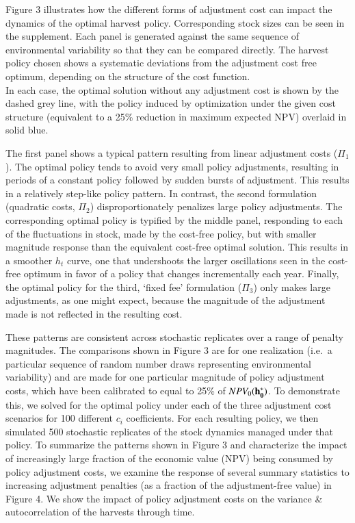 \documentclass[review,12pt,author-year,titlepage]{components/elsarticle} %
\begin{document}
\begin{flushleft}
Figure 3 illustrates how the different forms of adjustment cost can
impact the dynamics of the optimal harvest policy. Corresponding stock
sizes can be seen in the supplement. Each panel is generated against the
same sequence of environmental variability so that they can be compared
directly. The harvest policy chosen shows a systematic deviations from
the adjustment cost free optimum, depending on the structure of the cost
function.\\In each case, the optimal solution without any adjustment
cost is shown by the dashed grey line, with the policy induced by
optimization under the given cost structure (equivalent to a 25\%
reduction in maximum expected NPV) overlaid in solid blue.

The first panel shows a typical pattern resulting from linear adjustment
costs (\(\Pi_1\)). The optimal policy tends to avoid very small policy
adjustments, resulting in periods of a constant policy followed by
sudden bursts of adjustment. This results in a relatively step-like
policy pattern. In contrast, the second formulation (quadratic costs,
\(\Pi_2\)) disproportionately penalizes large policy adjustments. The
corresponding optimal policy is typified by the middle panel, responding
to each of the fluctuations in stock, made by the cost-free policy, but
with smaller magnitude response than the equivalent cost-free optimal
solution. This results in a smoother \(h_t\) curve, one that undershoots
the larger oscillations seen in the cost-free optimum in favor of a
policy that changes incrementally each year. Finally, the optimal policy
for the third, `fixed fee' formulation (\(\Pi_3\)) only makes large
adjustments, as one might expect, because the magnitude of the
adjustment made is not reflected in the resulting cost.

These patterns are consistent across stochastic replicates over a range
of penalty magnitudes. The comparisons shown in Figure 3 are for one
realization (i.e.~a particular sequence of random number draws
representing environmental variability) and are made for one particular
magnitude of policy adjustment costs, which have been calibrated to
equal to 25\% of \(NPV_0({\bf h_0^*})\). To demonstrate this, we solved
for the optimal policy under each of the three adjustment cost scenarios
for 100 different \(c_i\) coefficients. For each resulting policy, we
then simulated 500 stochastic replicates of the stock dynamics managed
under that policy. To summarize the patterns shown in Figure 3 and
characterize the impact of increasingly large fraction of the economic
value (NPV) being consumed by policy adjustment costs, we examine the
response of several summary statistics to increasing adjustment
penalties (as a fraction of the adjustment-free value) in Figure 4. We
show the impact of policy adjustment costs on the variance \&
autocorrelation of the harvests through time.


\end{flushleft}
\end{document}
